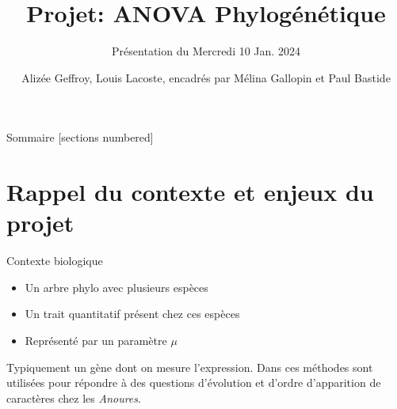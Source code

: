 \documentclass[10pt]{beamer}\usepackage[]{graphicx}\usepackage[]{xcolor}
\title{Projet: ANOVA Phylogénétique}
\subtitle{Présentation du Mercredi 10 Jan. 2024}
\date{}
\author{Alizée Geffroy, Louis Lacoste, encadrés par Mélina Gallopin et Paul Bastide}
\institute{M2 MathSV Université Paris-Saclay}
\begin{document}
\maketitle
\begin{frame}{Sommaire}
  [sections numbered]
  \tableofcontents%
\end{frame}

\section[Rappel du contexte et enjeux du projet]{Rappel du contexte et enjeux du projet}
\begin{frame}[fragile]{Contexte biologique}
\begin{itemize}
    \item Un arbre phylo avec plusieurs espèces
    \item Un trait quantitatif présent chez ces espèces
    \item Représenté par un paramètre $\mu$
\end{itemize}
Typiquement un gène dont on mesure l'expression.
Dans \textbf{\textcite{gomez-mestrePhylogeneticAnalysesReveal2012}} ces méthodes sont utilisées pour répondre à des questions d'évolution et d'ordre d'apparition de caractères chez les \emph{Anoures}.
\end{frame}
\end{document}
